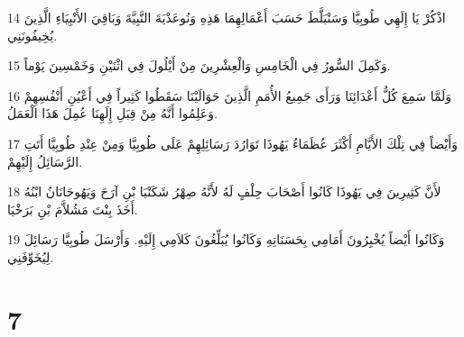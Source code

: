 \par 14 اذْكُرْ يَا إِلَهِي طُوبِيَّا وَسَنْبَلَّطَ حَسَبَ أَعْمَالِهِمَا هَذِهِ وَنُوعَدْيَةَ النَّبِيَّةَ وَبَاقِيَ الأَنْبِيَاءِ الَّذِينَ يُخِيفُونَنِي.
\par 15 وَكَمِلَ السُّورُ فِي الْخَامِسِ وَالْعِشْرِينَ مِنْ أَيْلُولَ فِي اثْنَيْنِ وَخَمْسِينَ يَوْماً.
\par 16 وَلَمَّا سَمِعَ كُلُّ أَعْدَائِنَا وَرَأَى جَمِيعُ الأُمَمِ الَّذِينَ حَوَالَيْنَا سَقَطُوا كَثِيراً فِي أَعْيُنِ أَنْفُسِهِمْ وَعَلِمُوا أَنَّهُ مِنْ قِبَلِ إِلَهِنَا عُمِلَ هَذَا الْعَمَلُ.
\par 17 وَأَيْضاً فِي تِلْكَ الأَيَّامِ أَكْثَرَ عُظَمَاءُ يَهُوذَا تَوَارُدَ رَسَائِلِهِمْ عَلَى طُوبِيَّا وَمِنْ عِنْدِ طُوبِيَّا أَتَتِ الرَّسَائِلُ إِلَيْهِمْ.
\par 18 لأَنَّ كَثِيرِينَ فِي يَهُوذَا كَانُوا أَصْحَابَ حِلْفٍ لَهُ لأَنَّهُ صِهْرُ شَكَنْيَا بْنِ آرَحَ وَيَهُوحَانَانُ ابْنُهُ أَخَذَ بِنْتَ مَشُلاَّمَ بْنِ بَرَخْيَا.
\par 19 وَكَانُوا أَيْضاً يُخْبِرُونَ أَمَامِي بِحَسَنَاتِهِ وَكَانُوا يُبَلِّغُونَ كَلاَمِي إِلَيْهِ. وَأَرْسَلَ طُوبِيَّا رَسَائِلَ لِيُخَوِّفَنِي.

\chapter{7}

